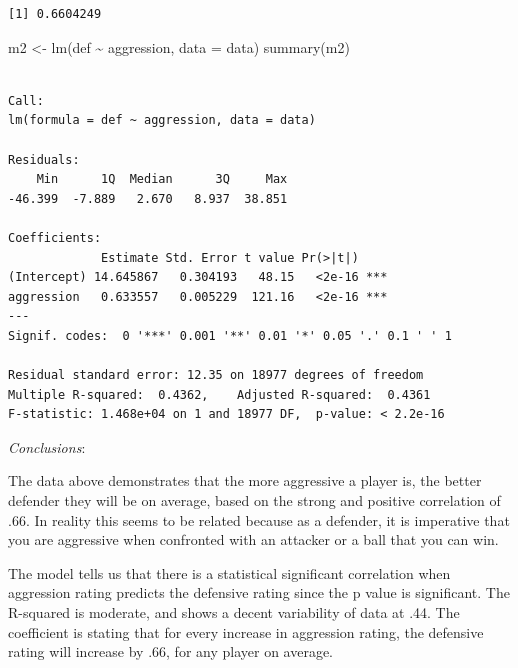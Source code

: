 \documentclass[
  letterpaper,
  DIV=11,
  numbers=noendperiod]{scrartcl}
\newenvironment{Shaded}{\begin{snugshade}}{\end{snugshade}}
\newcommand{\AttributeTok}[1]{\textcolor[rgb]{0.40,0.45,0.13}{#1}}
\newcommand{\FunctionTok}[1]{\textcolor[rgb]{0.28,0.35,0.67}{#1}}
\newcommand{\NormalTok}[1]{\textcolor[rgb]{0.00,0.23,0.31}{#1}}
\newcommand{\OtherTok}[1]{\textcolor[rgb]{0.00,0.23,0.31}{#1}}
\newcommand{\SpecialCharTok}[1]{\textcolor[rgb]{0.37,0.37,0.37}{#1}}
\begin{document}
\begin{Shaded}
\end{Shaded}

\begin{verbatim}
[1] 0.6604249
\end{verbatim}

\begin{Shaded}
\begin{Highlighting}[]
\NormalTok{m2 }\OtherTok{\textless{}{-}} \FunctionTok{lm}\NormalTok{(def }\SpecialCharTok{\textasciitilde{}}\NormalTok{ aggression, }\AttributeTok{data =}\NormalTok{ data)}
\FunctionTok{summary}\NormalTok{(m2)}
\end{Highlighting}
\end{Shaded}

\begin{verbatim}

Call:
lm(formula = def ~ aggression, data = data)

Residuals:
    Min      1Q  Median      3Q     Max 
-46.399  -7.889   2.670   8.937  38.851 

Coefficients:
             Estimate Std. Error t value Pr(>|t|)    
(Intercept) 14.645867   0.304193   48.15   <2e-16 ***
aggression   0.633557   0.005229  121.16   <2e-16 ***
---
Signif. codes:  0 '***' 0.001 '**' 0.01 '*' 0.05 '.' 0.1 ' ' 1

Residual standard error: 12.35 on 18977 degrees of freedom
Multiple R-squared:  0.4362,    Adjusted R-squared:  0.4361 
F-statistic: 1.468e+04 on 1 and 18977 DF,  p-value: < 2.2e-16
\end{verbatim}

\emph{Conclusions}:

The data above demonstrates that the more aggressive a player is, the
better defender they will be on average, based on the strong and
positive correlation of .66. In reality this seems to be related because
as a defender, it is imperative that you are aggressive when confronted
with an attacker or a ball that you can win.

The model tells us that there is a statistical significant correlation
when aggression rating predicts the defensive rating since the p value
is significant. The R-squared is moderate, and shows a decent
variability of data at .44. The coefficient is stating that for every
increase in aggression rating, the defensive rating will increase by
.66, for any player on average.
\end{document}
